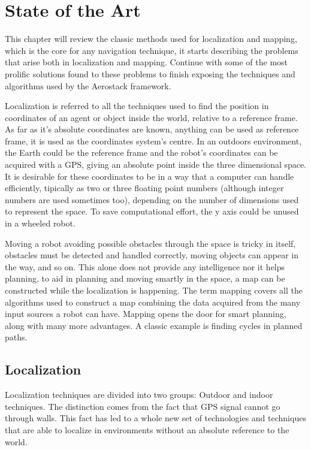 \chapter{State of the Art}

  This chapter will review the classic methods used for localization and mapping, which is the core for any navigation technique, it starts describing the problems that arise both in localization and mapping. Continue with some of the most prolific solutions found to these problems to finish exposing the techniques and algorithms used by the Aerostack framework.

  Localization is referred to all the techniques used to find the position in coordinates of an agent or object inside the world, relative to a reference frame. As far as it's absolute coordinates are known, anything can be used as reference frame, it is used as the coordinates system's centre. In an outdoors environment, the Earth could be the reference frame and the robot's coordinates can be acquired with a GPS, giving an absolute point inside the three dimensional space. It is desirable for these coordinates to be in a way that a computer can handle efficiently, tipically as two or three floating point numbers (although integer numbers are used sometimes too), depending on the number of dimensions used to represent the space. To save computational effort, the y axis could be unused in a wheeled robot.

  Moving a robot avoiding possible obstacles through the space is tricky in itself, obstacles must be detected and handled correctly, moving objects can appear in the way, and so on. This alone does not provide any intelligence nor it helps planning, to aid in planning and moving smartly in the space, a map can be constructed while the localization is happening. The term mapping covers all the algorithms used to construct a map combining the data acquired from the many input sources a robot can have. Mapping opens the door for smart planning, along with many more advantages. A classic example is finding cycles in planned paths.

  \clearpage

  \section{Localization}

    Localization techniques are divided into two groups: Outdoor and indoor techniques. The distinction comes from the fact that GPS signal cannot go through walls. This fact has led to a whole new set of technologies and techniques that are able to localize in environments without an absolute reference to the world.


